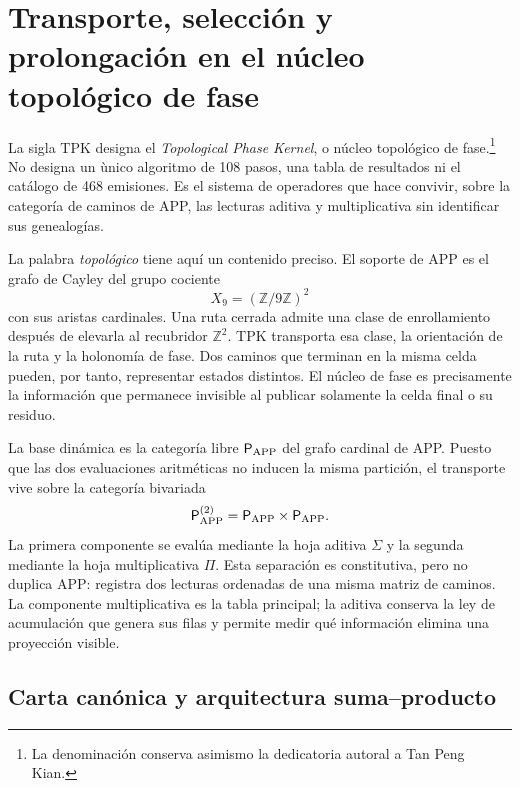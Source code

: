 \chapter{Transporte, selección y prolongación en el núcleo topológico de fase}
\label{sec:arquitectura-tpk}

La sigla TPK designa el \emph{Topological Phase Kernel}, o n\'ucleo
topol\'ogico de fase.\footnote{La denominaci\'on conserva asimismo la
dedicatoria autoral a Tan Peng Kian.} No designa un \`unico algoritmo de 108
pasos, una tabla de resultados ni el cat\'alogo de 468 emisiones. Es el
sistema de operadores que hace convivir, sobre la categor\'ia de caminos de
APP, las lecturas aditiva y multiplicativa sin identificar sus genealog\'ias.

La palabra \emph{topol\'ogico} tiene aqu\'i un contenido preciso. El soporte
de APP es el grafo de Cayley del grupo cociente
\[
 X_9=(\mathbb Z/9\mathbb Z)^2
\]
con sus aristas cardinales. Una ruta cerrada admite una clase de enrollamiento
despu\'es de elevarla al recubridor \(\mathbb Z^2\). TPK transporta esa clase,
la orientaci\'on de la ruta y la holonom\'ia de fase. Dos caminos que terminan
en la misma celda pueden, por tanto, representar estados distintos. El n\'ucleo
de fase es precisamente la informaci\'on que permanece invisible al publicar
solamente la celda final o su residuo.

La base dinámica es la categoría libre \(\mathsf P_{\rm APP}\) del grafo
cardinal de APP\@. Puesto que las dos evaluaciones aritméticas no inducen la
misma partición, el transporte vive sobre la categoría bivariada
\[
 \mathsf P_{\rm APP}^{(2)}
 =\mathsf P_{\rm APP}\times\mathsf P_{\rm APP}.
\]
La primera componente se evalúa mediante la hoja aditiva \(\Sigma\) y la
segunda mediante la hoja multiplicativa \(\Pi\). Esta separación es
constitutiva, pero no duplica APP: registra dos lecturas ordenadas de una
misma matriz de caminos. La componente multiplicativa es la tabla principal;
la aditiva conserva la ley de acumulación que genera sus filas y permite
medir qué información elimina una proyección visible.

\ifdefined\HMTTPKRepeatAPP
\section{Carta canónica y arquitectura suma--producto}

